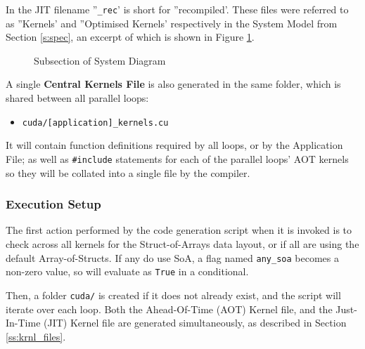 \noindent In the JIT filename ''\verb|_rec|' is short for ''recompiled'. These files were referred to as ''Kernels' and ''Optimised Kernels' respectively in the System Model from Section \ref{s:spec}, an excerpt of which is shown in Figure \ref{fig:mini_sys}.
\begin{figure}[h!]
  \caption{\label{fig:mini_sys}Subsection of System Diagram}
\end{figure}
\par
\noindent A single \textbf{Central Kernels File} is also generated in the same folder, which is shared between all parallel loops:
\begin{itemize}
\vspace{-.5em}
\item{\verb|cuda/[application]_kernels.cu|}
\end{itemize}
It will contain function definitions required by all loops, or by the Application File; as well as \verb|#include| statements for each of the parallel loops' AOT kernels so they will be collated into a single file by the compiler.

\subsubsection{Execution Setup}
The first action performed by the code generation script when it is invoked is to check across all kernels for the Struct-of-Arrays data layout, or if all are using the default Array-of-Structs. If any do use SoA, a flag named \verb|any_soa| becomes a non-zero value, so will evaluate as \verb|True| in a conditional.
\par Then, a folder \verb|cuda/| is created if it does not already exist, and the script will iterate over each loop. Both the Ahead-Of-Time (AOT) Kernel file, and the Just-In-Time (JIT) Kernel file are generated simultaneously, as described in Section \ref{ss:krnl_files}.

